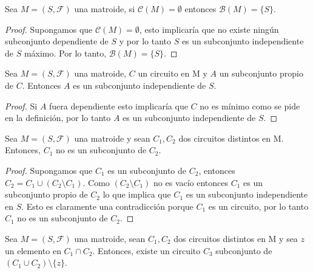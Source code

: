 \begin{cor}
Sea $M=(S,\mathcal{F})$ una matroide, si $\mathcal{C}(M)=\emptyset$ entonces $\mathcal{B}(M)=\{S\}$.
\end{cor}

\begin{proof}
Supongamos que $\mathcal{C}(M)=\emptyset$, esto implicaría que no existe ningún subconjunto dependiente de $S$ y por lo tanto $S$ es un subconjunto independiente de $S$ máximo. Por lo tanto, $\mathcal{B}(M)=\{S\}$.
\end{proof}

\begin{cor}
Sea $M=(S,\mathcal{F})$ una matroide, $C$ un circuito en M y $A$ un subconjunto propio de $C$. Entonces $A$ es un subconjunto independiente de $S$.
\end{cor}

\begin{proof}
Si $A$ fuera dependiente esto implicaría que $C$ no es mínimo como se pide en la definición, por lo tanto $A$ es un subconjunto independiente de $S$.
\end{proof}

\begin{cor} \label{C1}
Sea $M=(S,\mathcal{F})$ una matroide y sean $C_1, C_2$ dos circuitos distintos en M. Entonces, $C_1$ no es un subconjunto de $C_2$. 
\end{cor}

\begin{proof}
Supongamos que $C_1$ es un subconjunto de $C_2$, entonces $C_2=C_1 \cup (C_2 \setminus C_1)$. Como $(C_2 \setminus C_1)$ no es vacío entonces $C_1$ es un subconjunto propio de $C_2$ lo que implica que $C_1$ es un subconjunto independiente en $S$. Esto es claramente una contradicción porque $C_1$ es un circuito, por lo tanto $C_1$ no es un subconjunto de $C_2$.
\end{proof}

\begin{cor} \label{C2}
Sea $M=(S,\mathcal{F})$ una matroide, sean $C_1, C_2$ dos circuitos distintos en M y sea $z$ un elemento en $C_1 \cap C_2$. Entonces, existe un circuito $C_3$ subconjunto de $(C_1 \cup C_2)\setminus \{z\}$.
\end{cor}

